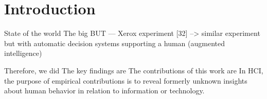 \section{Introduction}

State of the world \newline
The big BUT\newline
--- Xerox experiment [32] \newline
--> similar experiment but with automatic decision systems supporting a human (augmented intelligence)

Therefore, we did\newline
The key findings are\newline
The contributions of this work are\newline
In HCI, the purpose of empirical contributions is to reveal formerly unknown insights about human behavior in relation to information or technology.




